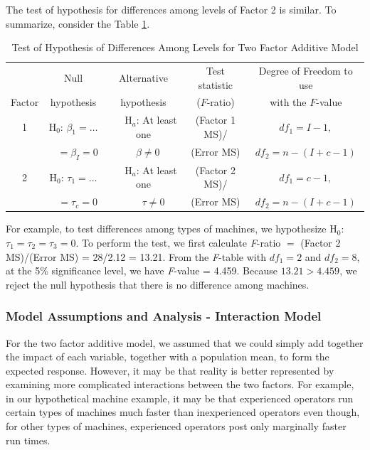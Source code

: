 The test of hypothesis for differences among levels of Factor 2 is
similar. To summarize, consider the Table \ref{T4:TwoFactorTests}.


  \begin{center}  \begin{table}[h]
\caption{\label{T4:TwoFactorTests} Test of Hypothesis of Differences
Among Levels for Two Factor Additive Model}

\begin{tabular}{ccccc}
\hline & Null & Alternative & Test statistic & Degree of Freedom to
use \\
Factor & hypothesis & hypothesis & ($F$-ratio) & with the $F$-value \\
\hline 1 & H$_0$: $\beta_1=\ldots$ & ~~~H$_a$: At least one  & (Factor 1 MS)/ & $df_1=I-1,$  \\
&  $~~~~=\beta_I=0$ & $
~~~~\beta \neq 0$ & (Error MS) &  $df_2=n-(I+c-1)$\\
2 & H$_0$: $\tau_1=\ldots $  & ~~~H$_a$: At least one  & (Factor 2 MS)/ & $df_1=c-1,$  \\
& $~~~~=\tau_c=0$ &  ~~~~$\tau \neq 0$& (Error MS) &
$df_2=n-(I+c-1)$ \\ \hline
\end{tabular}

\end{table}  \end{center}  

For example, to test differences among types of machines, we hypothesize H$%
_0$: $\tau_1=\tau_2=\tau_3=0$. To perform the test, we first
calculate \textit{F}-ratio $=$ (Factor 2 MS)/(Error MS) = 28/2.12 =
13.21. From the \textit{F}-table with $df_1=2$ and $df_2=8$, at the
5\% significance level, we have \textit{F}-value = 4.459. Because
$13.21>4.459$, we reject the null hypothesis that there is no
difference among machines.


\subsubsection*{Model Assumptions and Analysis - Interaction Model}

For the two factor additive model, we assumed that we could simply
add together the impact of each variable, together with a population
mean, to form the expected response. However, it may be that reality
is better represented by examining more complicated interactions
between the two factors. For example, in our hypothetical machine
example, it may be that experienced operators run certain types of
machines much faster than inexperienced operators even though, for
other types of machines, experienced operators post only marginally
faster run times.

